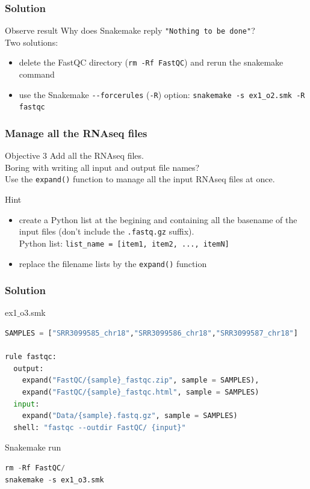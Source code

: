 \begin{frame}[containsverbatim]
\frametitle{Solution}
\begin{exampleblock}{Observe result}
Why does Snakemake reply \verb|"Nothing to be done"|?\\
Two solutions:\begin{itemize}
\item delete the FastQC directory (\verb|rm -Rf FastQC|) and rerun the snakemake command
\item use the Snakemake \verb|--forcerules| (\verb|-R|) option: \verb|snakemake -s ex1_o2.smk -R fastqc|
\end{itemize}
\end{exampleblock}
\end{frame}
\begin{frame}[containsverbatim]
\frametitle{Manage all the RNAseq files}
\begin{exampleblock}{Objective 3}
Add all the RNAseq files.\\
Boring with writing all input and output file names? \\
Use the \verb|expand()| function to manage all the input RNAseq files at once.
\end{exampleblock}
\begin{exampleblock}{Hint}
\begin{itemize}
    \item create a Python list at the begining and containing all the basename of the input files (don't include the \verb|.fastq.gz| suffix).\\
    Python list: \verb|list_name = [item1, item2, ..., itemN]|
    \item replace the filename lists by the \verb|expand()| function
\end{itemize}
\end{exampleblock}
\end{frame}
\begin{frame}[containsverbatim]
\frametitle{Solution}
\begin{exampleblock}{ex1$\_$o3.smk}
\begin{lstlisting}[language=python]
SAMPLES = ["SRR3099585_chr18","SRR3099586_chr18","SRR3099587_chr18"]

rule fastqc:
  output:
    expand("FastQC/{sample}_fastqc.zip", sample = SAMPLES),
    expand("FastQC/{sample}_fastqc.html", sample = SAMPLES)
  input:
    expand("Data/{sample}.fastq.gz", sample = SAMPLES)
  shell: "fastqc --outdir FastQC/ {input}"
\end{lstlisting}
\end{exampleblock}
\begin{exampleblock}{Snakemake run}
\begin{lstlisting}[language=python]
rm -Rf FastQC/
snakemake -s ex1_o3.smk
\end{lstlisting}
\end{exampleblock}
\end{frame}
